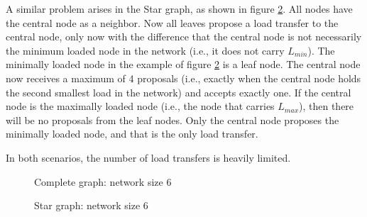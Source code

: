 A similar problem arises in the Star graph, as shown in figure \ref{fig:specialstargraphDemo}. All nodes have the central node as a neighbor. Now all leaves propose a load transfer to the central node, only now with the difference that the central node is not necessarily the minimum loaded node in the network (i.e., it does not carry $L_{min}$). The minimally loaded node in the example of figure \ref{fig:specialstargraphDemo} is a leaf node. The central node now receives a maximum of 4 proposals (i.e., exactly when the central node holds the second smallest load in the network) and accepts exactly one. If the central node is the maximally loaded node (i.e., the node that carries $L_{max}$), then there will be no proposals from the leaf nodes. Only the central node proposes the minimally loaded node, and that is the only load transfer.

In both scenarios, the number of load transfers is heavily limited.
\begin{figure}[]
    \centering
    
    \caption{Complete graph: network size 6}
    \label{fig:specialcompletegraphDemo}
\end{figure}
\begin{figure}[]
    \centering
    
    \caption{Star graph: network size 6}
    \label{fig:specialstargraphDemo}
\end{figure}